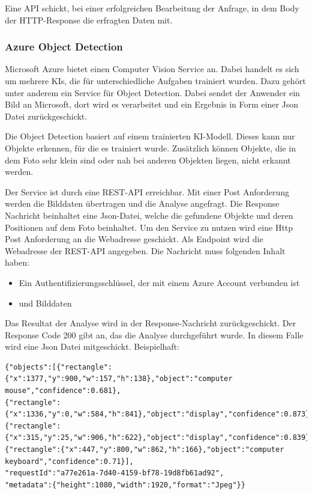 Eine API schickt, bei einer erfolgreichen Bearbeitung der Anfrage, in dem Body der HTTP-Response die erfragten Daten mit.

\subsubsection{Azure Object Detection}
Microsoft Azure bietet einen Computer Vision Service an. Dabei handelt es sich um mehrere KIs, die für unterschiedliche Aufgaben trainiert wurden. Dazu gehört unter anderem ein Service für Object Detection. Dabei sendet der Anwender ein Bild an Microsoft, dort wird es verarbeitet und ein Ergebnis in Form einer Json Datei zurückgeschickt.\citep{getAzure,whatIsAzure,objDetectAzure,Azure302Doc}

Die Object Detection basiert auf einem trainierten KI-Modell. Dieses kann nur Objekte erkennen, für die es trainiert wurde. Zusätzlich können Objekte, die in dem Foto sehr klein sind oder nah bei anderen Objekten liegen, nicht erkannt werden.\citep{azureobjdetec}

Der Service ist durch eine REST-API erreichbar. Mit einer Post Anforderung werden die Bilddaten übertragen und die Analyse angefragt. Die Response Nachricht beinhaltet eine Json-Datei, welche die gefundene Objekte und deren Positionen auf dem Foto beinhaltet. Um den Service zu nutzen wird eine Http Post Anforderung an die Webadresse geschickt. Als Endpoint wird die Webadresse der REST-API angegeben. Die Nachricht muss folgenden Inhalt haben:
\begin{itemize}
	\item Ein Authentifizierungsschlüssel, der mit einem Azure Account verbunden ist
	\item und Bilddaten
\end{itemize}

Das Resultat der Analyse wird in der Response-Nachricht zurückgeschickt. Der Response Code 200 gibt an, das die Analyse durchgeführt wurde. In diesem Falle wird eine Json Datei mitgeschickt. Beispielhaft:

\begin{lstlisting}
{"objects":[{"rectangle":{"x":1377,"y":900,"w":157,"h":138},"object":"computer mouse","confidence":0.681},
{"rectangle":{"x":1336,"y":0,"w":584,"h":841},"object":"display","confidence":0.873},
{"rectangle":{"x":315,"y":25,"w":906,"h":622},"object":"display","confidence":0.839},
{"rectangle":{"x":447,"y":800,"w":862,"h":166},"object":"computer keyboard","confidence":0.71}],
"requestId":"a77e261a-7d40-4159-bf78-19d8fb61ad92",
"metadata":{"height":1080,"width":1920,"format":"Jpeg"}}
\end{lstlisting}

